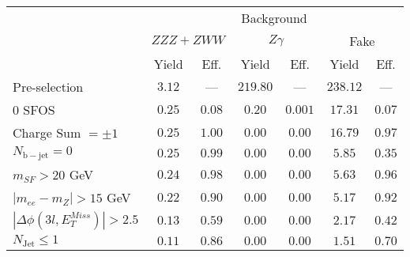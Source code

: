\begin{tabular}{l||c|c||c|c||c|c}
\hline
 &  \multicolumn{6}{c}{Background} \\
 & \multicolumn{2}{c||}{$ZZZ+ZWW$} & \multicolumn{2}{c||}{$Z\gamma$} & \multicolumn{2}{c}{Fake}  \\ 
 & Yield & Eff. & Yield & Eff. & Yield & Eff. \\
\hline\hline
Pre-selection &  $3.12$ & --- &  $219.80$ &  --- &  $238.12$ &  --- \\ 
\hline
0 SFOS &  $0.25$ &  $0.08$ &  $0.20$ &  $0.001$ &  $17.31$ &  $0.07$ \\ 
\hline
Charge Sum $= \pm 1$ &  $0.25$ &  $1.00$ &  $0.00$ &  $0.00$ &  $16.79$ &  $0.97$ \\ 
\hline
$N_{\mathrm{b-jet}} = 0$ &$0.25$ &  $0.99$ &  $0.00$ &  $0.00$ &  $5.85$ &  $0.35$ \\ 
\hline
$m_{SF} > 20$ GeV &$0.24$ &  $0.98$ &  $0.00$ &  $0.00$ &  $5.63$ &  $0.96$ \\ 
\hline
$|m_{ee} - m_{Z}| > 15$ GeV &$0.22$ &  $0.90$ &  $0.00$ &  $0.00$ &  $5.17$ &  $0.92$ \\ 
\hline
$|\Delta\phi(3l,E_{T}^{Miss})| > 2.5$ &$0.13$ &  $0.59$ &  $0.00$ &  $0.00$ &  $2.17$ &  $0.42$ \\ 
\hline
$N_{\mathrm{Jet}} \leq 1$ &$0.11$ &  $0.86$ &  $0.00$ &  $0.00$ &  $1.51$ &  $0.70$ \\ 
\hline
\end{tabular}




